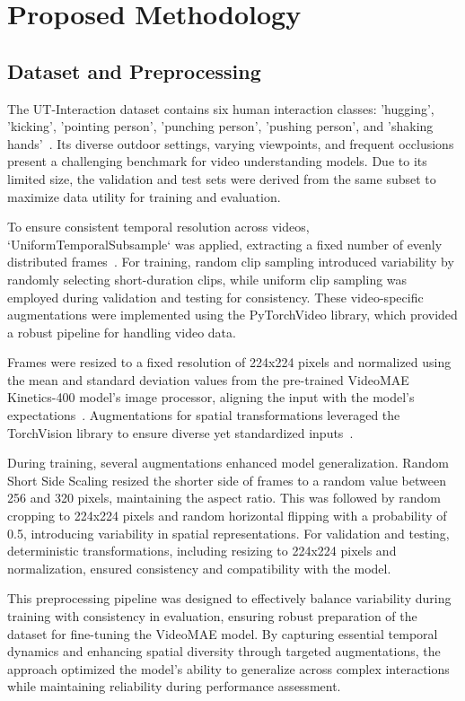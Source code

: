 \documentclass[runningheads]{llncs}
\begin{document}
	\section{Proposed Methodology}
	
\subsection{Dataset and Preprocessing} \label{sec:dataset}
The UT-Interaction dataset contains six human interaction classes: 'hugging', 'kicking', 'pointing person', 'punching person', 'pushing person', and 'shaking hands'~\cite{utdataset}. Its diverse outdoor settings, varying viewpoints, and frequent occlusions present a challenging benchmark for video understanding models. Due to its limited size, the validation and test sets were derived from the same subset to maximize data utility for training and evaluation.

To ensure consistent temporal resolution across videos, `UniformTemporalSubsample` was applied, extracting a fixed number of evenly distributed frames~\cite{pytorchvideo}. For training, random clip sampling introduced variability by randomly selecting short-duration clips, while uniform clip sampling was employed during validation and testing for consistency. These video-specific augmentations were implemented using the PyTorchVideo library, which provided a robust pipeline for handling video data.

Frames were resized to a fixed resolution of 224x224 pixels and normalized using the mean and standard deviation values from the pre-trained VideoMAE Kinetics-400 model’s image processor, aligning the input with the model’s expectations~\cite{videomae_paper}. Augmentations for spatial transformations leveraged the TorchVision library to ensure diverse yet standardized inputs~\cite{torchvision}.

During training, several augmentations enhanced model generalization. Random Short Side Scaling resized the shorter side of frames to a random value between 256 and 320 pixels, maintaining the aspect ratio. This was followed by random cropping to 224x224 pixels and random horizontal flipping with a probability of 0.5, introducing variability in spatial representations. For validation and testing, deterministic transformations, including resizing to 224x224 pixels and normalization, ensured consistency and compatibility with the model.

This preprocessing pipeline was designed to effectively balance variability during training with consistency in evaluation, ensuring robust preparation of the dataset for fine-tuning the VideoMAE model. By capturing essential temporal dynamics and enhancing spatial diversity through targeted augmentations, the approach optimized the model’s ability to generalize across complex interactions while maintaining reliability during performance assessment.
\end{document}
